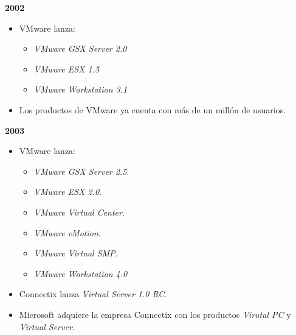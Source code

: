 \textbf{2002}
\begin{itemize}
	\item VMware lanza: \\
	\begin{itemize}
		\item \textit{VMware GSX Server 2.0}\\
		\item \textit{VMware ESX 1.5}\\
		\item \textit{VMware Workstation 3.1}\\
	\end{itemize}
	
	 \item Los productos de VMware ya cuenta con más de un millón de usuarios. \\
\end{itemize}

\textbf{2003}
\begin{itemize}
	\item VMware lanza: \\
	\begin{itemize}
		\item \textit{VMware GSX Server 2.5}.\\
		\item \textit{VMware ESX 2.0}.\\
		\item \textit{VMware Virtual Center}.\\
		\item \textit{VMware vMotion}.\\
		\item \textit{VMware Virtual SMP}.\\
		\item \textit{VMware Workstation 4.0}\\
	\end{itemize}
	\item Connectix lanza \textit{Virtual Server 1.0 RC}.\\
	
	\item Microsoft adquiere la empresa Connectix con los productos \textit{Virutal PC} y \textit{Virtual Server}. \\
	
\end{itemize}
			
